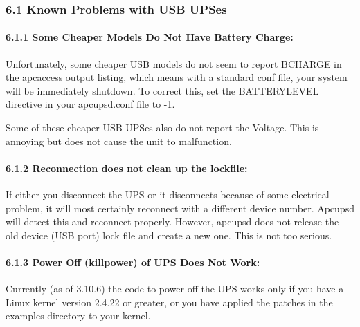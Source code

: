 \label{Known-Problems-with-USB-UPSes}

\subsubsection*{6.1 Known Problems with USB UPSes}

\label{index-Problems_002c-USB-103}

\label{Some-Cheaper-Models-Do-Not-Have-Battery-Charge}

\paragraph*{6.1.1 Some Cheaper Models Do Not Have Battery Charge:}

\label{index-Problems_002c-no-Battery-charge-104}
Unfortunately, some cheaper USB models do not seem to report BCHARGE in the
apcaccess output listing, which means with a standard conf file, your system
will be immediately shutdown. To correct this, set the BATTERYLEVEL directive
in your apcupsd.conf file to -1.  

Some of these cheaper USB UPSes also do not report the Voltage. This is
annoying but does not cause the unit to malfunction. 

\label{Reconnection-does-not-clean-up-the-lockfile}

\paragraph*{6.1.2 Reconnection does not clean up the lockfile:}

\label{index-Problems_002c-lock-file-not-cleaned-up-105}
If either you disconnect the UPS or it disconnects because of some electrical
problem, it will most certainly reconnect with a different device number.
Apcupsd will detect this and reconnect properly. However, apcupsd does not
release the old device (USB port) lock file and create a new one. This is not
too serious. 

\label{Power-Off-_005bkillpower_005d-of-UPS-Does-Not-Work}

\paragraph*{6.1.3 Power Off (killpower) of UPS Does Not Work:}

\label{index-Problems_002c-Power-off-106}
\label{index-Problems_002c-killpower-107}
Currently (as of 3.10.6) the code to power off the UPS works only if you have
a Linux kernel version 2.4.22 or greater, or you have applied the patches in
the examples directory to your kernel. 

